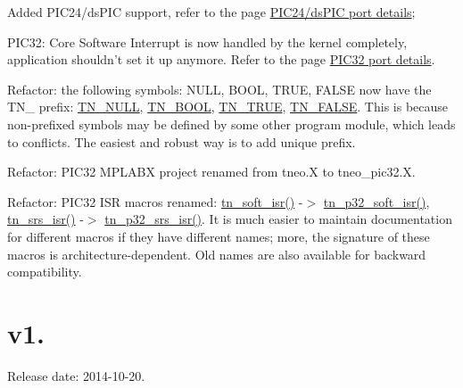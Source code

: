 \begin{DoxyItemize}
\item Added P\+I\+C24/ds\+P\+I\+C support, refer to the page \hyperlink{arch_specific_pic24_details}{P\+I\+C24/ds\+P\+I\+C port details};
\item P\+I\+C32\+: Core Software Interrupt is now handled by the kernel completely, application shouldn't set it up anymore. Refer to the page \hyperlink{arch_specific_pic32_details}{P\+I\+C32 port details}.
\item Refactor\+: the following symbols\+: {\ttfamily N\+U\+L\+L}, {\ttfamily B\+O\+O\+L}, {\ttfamily T\+R\+U\+E}, {\ttfamily F\+A\+L\+S\+E} now have the {\ttfamily T\+N\+\_\+} prefix\+: {\ttfamily \hyperlink{tn__common_8h_adbf9c425147511997eb1396c4afeac40}{T\+N\+\_\+\+N\+U\+L\+L}}, {\ttfamily \hyperlink{tn__common_8h_a9f76389d1506addfc7542f54e484a92c}{T\+N\+\_\+\+B\+O\+O\+L}}, {\ttfamily \hyperlink{tn__common_8h_a87ed178a95496e2f19aa670adc4886b3}{T\+N\+\_\+\+T\+R\+U\+E}}, {\ttfamily \hyperlink{tn__common_8h_aa32a38a7d2e3b7983e53a61ab05417ee}{T\+N\+\_\+\+F\+A\+L\+S\+E}}. This is because non-\/prefixed symbols may be defined by some other program module, which leads to conflicts. The easiest and robust way is to add unique prefix.
\item Refactor\+: P\+I\+C32 M\+P\+L\+A\+B\+X project renamed from {\ttfamily tneo.\+X} to {\ttfamily tneo\+\_\+pic32.\+X}.
\item Refactor\+: P\+I\+C32 I\+S\+R macros renamed\+: {\ttfamily \hyperlink{tn__arch__pic32_8h_afde61cfabbeed1562ea2135fea8e919b}{tn\+\_\+soft\+\_\+isr()}} -\/$>$ {\ttfamily \hyperlink{tn__arch__pic32_8h_a02d853d8d573f928fb8da65ef0c2bc8e}{tn\+\_\+p32\+\_\+soft\+\_\+isr()}}, {\ttfamily \hyperlink{tn__arch__pic32_8h_a714962dd7eb6b94feee7f4d769b601c0}{tn\+\_\+srs\+\_\+isr()}} -\/$>$ {\ttfamily \hyperlink{tn__arch__pic32_8h_a523bb667617e6bb6f68a8f85855030a5}{tn\+\_\+p32\+\_\+srs\+\_\+isr()}}. It is much easier to maintain documentation for different macros if they have different names; more, the signature of these macros is architecture-\/dependent. Old names are also available for backward compatibility.
\end{DoxyItemize}\hypertarget{changelog_changelog_v1_03}{}\section{v1.}\label{changelog_changelog_v1_03}
Release date\+: 2014-\/10-\/20.



